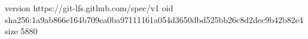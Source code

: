 version https://git-lfs.github.com/spec/v1
oid sha256:1a9ab866e164b709ca0ba97111161a054d3650dbd525bb26c8d2dec9b42b82e4
size 5880
